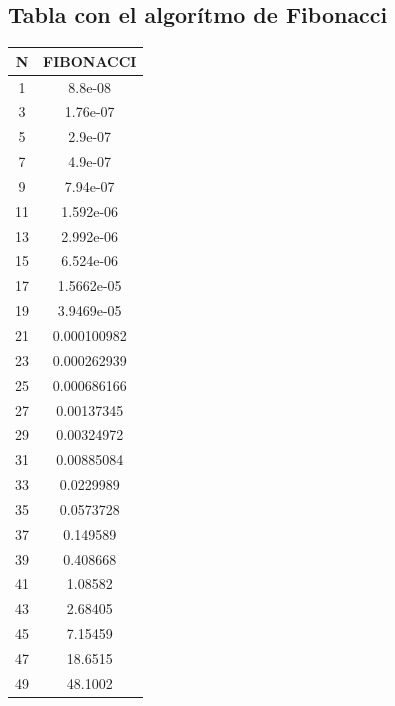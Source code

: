 \documentclass[11pt,spanish]{article} %
\begin{document}
\subsection{Tabla con el algor\'itmo de Fibonacci}
\begin{center}
\begin{tabular}{|c|c|}
\hline
N  & FIBONACCI   \\ \hline
1  & 8.8e-08     \\ \hline
3  & 1.76e-07    \\ \hline
5  & 2.9e-07     \\ \hline
7  & 4.9e-07     \\ \hline
9  & 7.94e-07    \\ \hline
11 & 1.592e-06   \\ \hline
13 & 2.992e-06   \\ \hline
15 & 6.524e-06   \\ \hline
17 & 1.5662e-05  \\ \hline
19 & 3.9469e-05  \\ \hline
21 & 0.000100982 \\ \hline
23 & 0.000262939 \\ \hline
25 & 0.000686166 \\ \hline
27 & 0.00137345  \\ \hline
29 & 0.00324972  \\ \hline
31 & 0.00885084  \\ \hline
33 & 0.0229989   \\ \hline
35 & 0.0573728   \\ \hline
37 & 0.149589    \\ \hline
39 & 0.408668    \\ \hline
41 & 1.08582     \\ \hline
43 & 2.68405     \\ \hline
45 & 7.15459     \\ \hline
47 & 18.6515     \\ \hline
49 & 48.1002     \\ \hline
\end{tabular}
\end{center}
\end{document}
